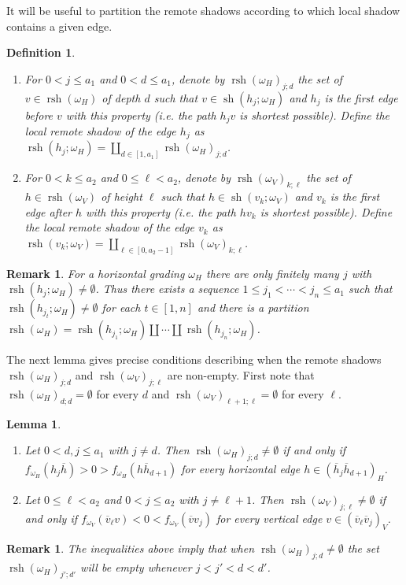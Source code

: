 \documentclass{amsart}
\newtheorem{definition}[theorem]{Definition}
\newtheorem{lemma}[theorem]{Lemma}
\newtheorem{remark}[theorem]{Remark}
\newcommand{\rsh}{\operatorname{rsh}}
\newcommand{\sh}{\operatorname{sh}}
\newenvironment{enumeratea}{\begin{enumerate}[\upshape (a)]}
                           {\end{enumerate}}
\begin{document}
 It will be useful to partition the remote shadows according to which local shadow contains a given edge. 
 \begin{definition}\label{def:remote_shadows}\mbox{}
  \begin{enumeratea}
   \item For $0<j\le a_1$ and $0<d\le a_1$, denote by $\rsh(\omega_H)_{j;d}$ the set of $v\in\rsh(\omega_H)$ of depth $d$ such that $v\in\sh(h_j;\omega_H)$ and $h_j$ is the first edge before $v$ with this property (i.e. the path $h_jv$ is shortest possible).  Define the \emph{local remote shadow} of the edge $h_j$ as $\rsh(h_j;\omega_H)=\coprod\limits_{d\in[1,a_1]}\rsh(\omega_H)_{j;d}$.
   \item For $0<k\le a_2$ and $0\le \ell<a_2$, denote by $\rsh(\omega_V)_{k;\ell}$ the set of $h\in\rsh(\omega_V)$ of height $\ell$ such that $h\in\sh(v_k;\omega_V)$ and $v_k$ is the first edge after $h$ with this property (i.e. the path $hv_k$ is shortest possible).  Define the \emph{local remote shadow} of the edge $v_k$ as $\rsh(v_k;\omega_V)=\coprod\limits_{\ell\in[0,a_2-1]}\rsh(\omega_V)_{k;\ell}$.
  \end{enumeratea}
 \end{definition}
 \begin{remark}\label{rem:remote_shadow_decomposition}
  For a horizontal grading $\omega_H$ there are only finitely many $j$ with $\rsh(h_j;\omega_H)\ne\emptyset$.  Thus there exists a sequence $1\le j_1<\cdots<j_n\le a_1$ such that $\rsh(h_{j_t};\omega_H)\ne\emptyset$ for each $t\in[1,n]$ and there is a partition $\rsh(\omega_H)=\rsh(h_{j_1};\omega_H)\amalg\cdots\amalg\rsh(h_{j_n};\omega_H)$.
 \end{remark}

 The next lemma gives precise conditions describing when the remote shadows $\rsh(\omega_H)_{j;d}$ and $\rsh(\omega_V)_{j;\ell}$ are non-empty.  First note that $\rsh(\omega_H)_{d;d}=\emptyset$ for every $d$ and $\rsh(\omega_V)_{\ell+1;\ell}=\emptyset$ for every $\ell$.
 \begin{lemma}\label{le:remote_shadow_conditions}\mbox{}
  \begin{enumeratea}
   \item Let $0<d,j\le a_1$ with $j\ne d$.  Then $\rsh(\omega_H)_{j;d}\ne\emptyset$ if and only if $f_{\omega_H}(h_j\overline{h})>0>f_{\omega_H}(h\overline{h}_{d+1})$ for every horizontal edge $h\in (\overline{h}_j\overline{h}_{d+1})_H$.
   \item Let $0\le\ell< a_2$ and $0<j\le a_2$ with $j\ne\ell+1$.  Then $\rsh(\omega_V)_{j;\ell}\ne\emptyset$ if and only if $f_{\omega_V}(\overline{v}_\ell v)<0<f_{\omega_V}(\overline{v}v_j)$ for every vertical edge $v\in (\overline{v}_\ell\overline{v}_j)_V$.
  \end{enumeratea}
 \end{lemma}
 \begin{remark}
  The inequalities above imply that when $\rsh(\omega_H)_{j;d}\ne\emptyset$ the set $\rsh(\omega_H)_{j';d'}$ will be empty whenever $j<j'<d<d'$.
 \end{remark}
\end{document}
